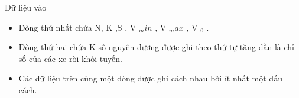 Dữ liệu vào
\begin{itemize}
	\item     Dòng thứ nhất chứa N, K ,S , V    $_     min    $    , V    $_     max    $    , V    $_     0    $    .   
	\item     Dòng thứ hai chứa K số nguyên dương được ghi theo thứ tự tăng dần là chỉ số của các xe rời khỏi tuyến.   
	\item     Các dữ liệu trên cùng một dòng được ghi cách nhau bởi ít nhất một dấu cách.   
\end{itemize}